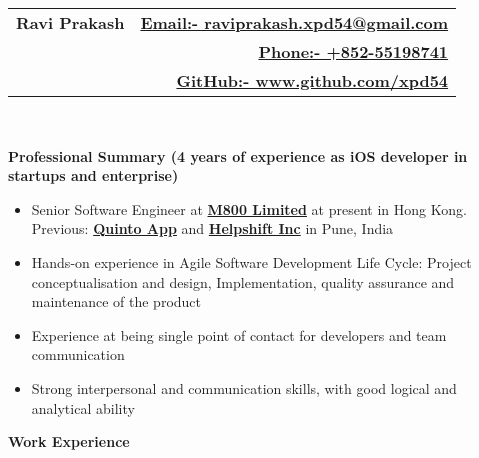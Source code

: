 \documentclass[letterpaper,11pt]{article}
\newcommand{\resitem}[1]{\item #1 \vspace{-2pt}}
\newcommand{\resheading}[1]{{\large \colorbox{mygrey}{\begin{minipage}{\textwidth}{\textbf{#1 \vphantom{p\^{E}}}}\end{minipage}}}}
\begin{document}
\newcommand{\mywebheader}{
\begin{tabular*}{7in}{l@{\extracolsep{\fill}}r}
\textbf{\Huge \bfseries Ravi Prakash} 
& \href{mailto:raviprakash.xpd54@gmail.com}{\normalsize \bfseries Email:- \mdseries raviprakash.xpd54@gmail.com}\\
 & \href{tel:+85255198741}{\normalsize \bfseries Phone:- \mdseries +852-55198741}\\
 & \href{http://www.github.com/xpd54}{\normalsize \bfseries GitHub:- \mdseries www.github.com/xpd54}\\
\end{tabular*}
\\}
\mywebheader

\resheading{\Large Professional Summary \bfseries \normalsize \newline 
(4 years of experience as iOS developer in startups and enterprise)}
{ \footnotesize
\begin{itemize}
\resitem{Senior Software Engineer at \href{https://www.m800.com/}{\bfseries M800 Limited} at present in Hong Kong. Previous: \href{http://quintoapp.com}{\bfseries Quinto App} and \href{helpshift.com} {\bfseries  Helpshift Inc} in Pune, India}
\resitem{Hands-on experience in Agile Software Development Life Cycle: Project conceptualisation and design, Implementation,
quality assurance and maintenance of the product}
\resitem{Experience at being single point of contact for developers and team communication}
\resitem{Strong interpersonal and communication skills, with good logical and analytical ability}
\end{itemize}
} %

\resheading{Work Experience}
\end{document}
